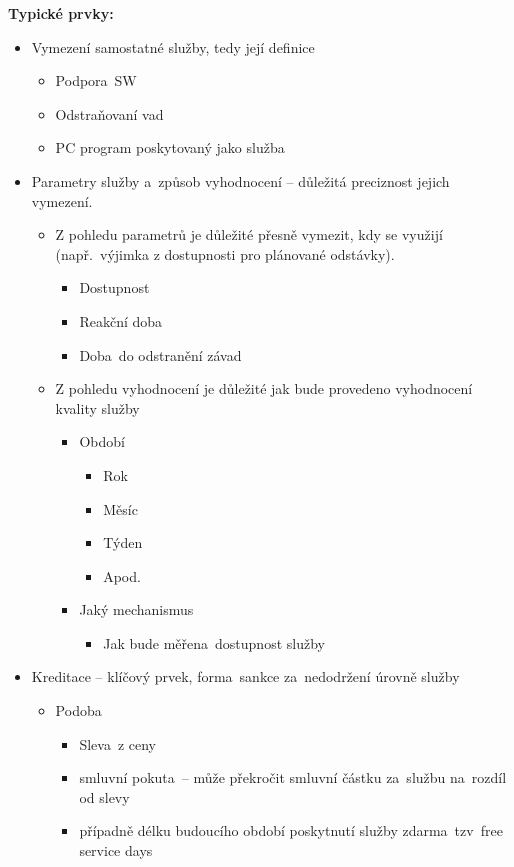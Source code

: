 \noindent\textbf{Typické prvky:}
\begin{itemize}[noitemsep]
    \item Vymezení samostatné služby, tedy její definice
    \begin{itemize}[noitemsep]
        \item Podpora~SW
        \item Odstraňovaní vad
        \item PC program poskytovaný jako služba
    \end{itemize}
    \item Parametry služby a~způsob vyhodnocení -- důležitá preciznost jejich vymezení.
    \begin{itemize}[noitemsep]
        \item Z pohledu parametrů je důležité přesně vymezit, kdy se využijí (např.\ výjimka z dostupnosti pro plánované odstávky).
        \begin{itemize}[noitemsep]
            \item Dostupnost
            \item Reakční doba
            \item Doba~do odstranění závad
        \end{itemize}
        \item  Z pohledu vyhodnocení je důležité jak bude provedeno vyhodnocení kvality služby
        \begin{itemize}[noitemsep]
            \item Období
            \begin{itemize}[noitemsep]
                \item Rok
                \item Měsíc
                \item Týden
                \item Apod.
            \end{itemize}
            \item Jaký mechanismus
            \begin{itemize}[noitemsep]
                \item Jak bude měřena~dostupnost služby
            \end{itemize}
        \end{itemize}
    \end{itemize}
    \item Kreditace -- klíčový prvek, forma~sankce za~nedodržení úrovně služby
    \begin{itemize}[noitemsep]
        \item Podoba
        \begin{itemize}[noitemsep]
            \item  Sleva~z ceny
            \item smluvní pokuta~-- může překročit smluvní částku za~službu na~rozdíl od slevy
            \item případně délku budoucího období poskytnutí služby zdarma~tzv~free service days
        \end{itemize}
    \end{itemize}
\end{itemize}


